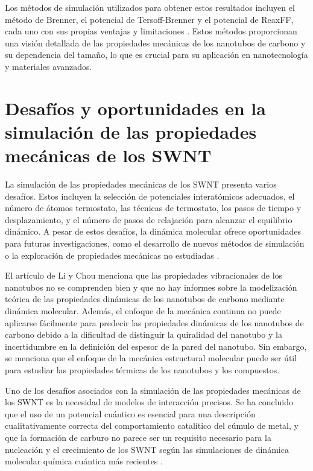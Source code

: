 \documentclass[a4paper]{article}
\begin{document}
Los métodos de simulación utilizados para obtener estos resultados incluyen el método de Brenner, el potencial de Tersoff-Brenner y el potencial de ReaxFF, cada uno con sus propias ventajas y limitaciones \cite{mylvaganam2004important}. Estos métodos proporcionan una visión detallada de las propiedades mecánicas de los nanotubos de carbono y su dependencia del tamaño, lo que es crucial para su aplicación en nanotecnología y materiales avanzados.

\section{Desafíos y oportunidades en la simulación de las propiedades mecánicas de los SWNT}

La simulación de las propiedades mecánicas de los SWNT presenta varios desafíos. Estos incluyen la selección de potenciales interatómicos adecuados, el número de átomos termostato, las técnicas de termostato, los pasos de tiempo y desplazamiento, y el número de pasos de relajación para alcanzar el equilibrio dinámico. A pesar de estos desafíos, la dinámica molecular ofrece oportunidades para futuras investigaciones, como el desarrollo de nuevos métodos de simulación o la exploración de propiedades mecánicas no estudiadas \cite{mylvaganam2004important}.

El artículo de Li y Chou \cite{li2006modeling} menciona que las propiedades vibracionales de los nanotubos no se comprenden bien y que no hay informes sobre la modelización teórica de las propiedades dinámicas de los nanotubos de carbono mediante dinámica molecular. Además, el enfoque de la mecánica continua no puede aplicarse fácilmente para predecir las propiedades dinámicas de los nanotubos de carbono debido a la dificultad de distinguir la quiralidad del nanotubo y la incertidumbre en la definición del espesor de la pared del nanotubo. Sin embargo, se menciona que el enfoque de la mecánica estructural molecular puede ser útil para estudiar las propiedades térmicas de los nanotubos y los compuestos.

Uno de los desafíos asociados con la simulación de las propiedades mecánicas de los SWNT es la necesidad de modelos de interacción precisos. Se ha concluido que el uso de un potencial cuántico es esencial para una descripción cualitativamente correcta del comportamiento catalítico del cúmulo de metal, y que la formación de carburo no parece ser un requisito necesario para la nucleación y el crecimiento de los SWNT según las simulaciones de dinámica molecular química cuántica más recientes \cite{irle2009milestones}.
\end{document}
